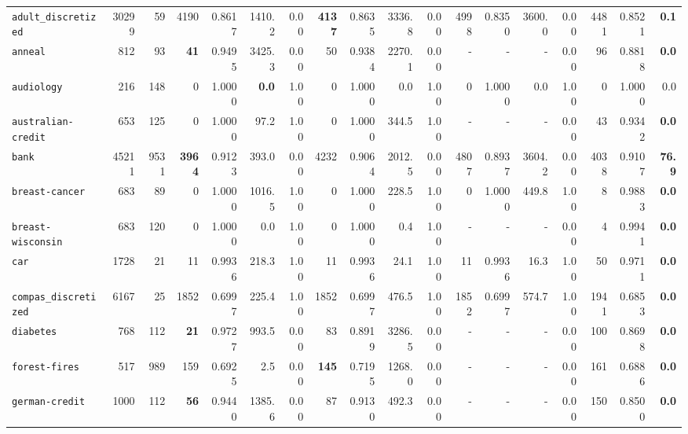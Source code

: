 \begin{tabular}{lccrrrrrrrrrrrrrrr}
\texttt{adult\_discretized} & \multicolumn{1}{r}{30299} & \multicolumn{1}{r}{59}  & 4190 & 0.8617 & 1410.2 & 0.00 & \textbf{4137} & 0.8635 & 3336.8 & 0.00 & 4998 & 0.8350 & 3600.0 & 0.00 & 4481 & 0.8521 & \textbf{0.1}\\
\texttt{anneal} & \multicolumn{1}{r}{812} & \multicolumn{1}{r}{93}  & \textbf{41} & 0.9495 & 3425.3 & 0.00 & 50 & 0.9384 & 2270.1 & 0.00 & - & - & - & 0.00 & 96 & 0.8818 & \textbf{0.0}\\
\texttt{audiology} & \multicolumn{1}{r}{216} & \multicolumn{1}{r}{148}  & 0 & 1.0000 & \textbf{0.0} & 1.00 & 0 & 1.0000 & 0.0 & 1.00 & 0 & 1.0000 & 0.0 & 1.00 & 0 & 1.0000 & 0.0\\
\texttt{australian-credit} & \multicolumn{1}{r}{653} & \multicolumn{1}{r}{125}  & 0 & 1.0000 & 97.2 & 1.00 & 0 & 1.0000 & 344.5 & 1.00 & - & - & - & 0.00 & 43 & 0.9342 & \textbf{0.0}\\
\texttt{bank} & \multicolumn{1}{r}{45211} & \multicolumn{1}{r}{9531}  & \textbf{3964} & 0.9123 & 393.0 & 0.00 & 4232 & 0.9064 & 2012.5 & 0.00 & 4807 & 0.8937 & 3604.2 & 0.00 & 4038 & 0.9107 & \textbf{76.9}\\
\texttt{breast-cancer} & \multicolumn{1}{r}{683} & \multicolumn{1}{r}{89}  & 0 & 1.0000 & 1016.5 & 1.00 & 0 & 1.0000 & 228.5 & 1.00 & 0 & 1.0000 & 449.8 & 1.00 & 8 & 0.9883 & \textbf{0.0}\\
\texttt{breast-wisconsin} & \multicolumn{1}{r}{683} & \multicolumn{1}{r}{120}  & 0 & 1.0000 & 0.0 & 1.00 & 0 & 1.0000 & 0.4 & 1.00 & - & - & - & 0.00 & 4 & 0.9941 & \textbf{0.0}\\
\texttt{car} & \multicolumn{1}{r}{1728} & \multicolumn{1}{r}{21}  & 11 & 0.9936 & 218.3 & 1.00 & 11 & 0.9936 & 24.1 & 1.00 & 11 & 0.9936 & 16.3 & 1.00 & 50 & 0.9711 & \textbf{0.0}\\
\texttt{compas\_discretized} & \multicolumn{1}{r}{6167} & \multicolumn{1}{r}{25}  & 1852 & 0.6997 & 225.4 & 1.00 & 1852 & 0.6997 & 476.5 & 1.00 & 1852 & 0.6997 & 574.7 & 1.00 & 1941 & 0.6853 & \textbf{0.0}\\
\texttt{diabetes} & \multicolumn{1}{r}{768} & \multicolumn{1}{r}{112}  & \textbf{21} & 0.9727 & 993.5 & 0.00 & 83 & 0.8919 & 3286.5 & 0.00 & - & - & - & 0.00 & 100 & 0.8698 & \textbf{0.0}\\
\texttt{forest-fires} & \multicolumn{1}{r}{517} & \multicolumn{1}{r}{989}  & 159 & 0.6925 & 2.5 & 0.00 & \textbf{145} & 0.7195 & 1268.0 & 0.00 & - & - & - & 0.00 & 161 & 0.6886 & \textbf{0.0}\\
\texttt{german-credit} & \multicolumn{1}{r}{1000} & \multicolumn{1}{r}{112}  & \textbf{56} & 0.9440 & 1385.6 & 0.00 & 87 & 0.9130 & 492.3 & 0.00 & - & - & - & 0.00 & 150 & 0.8500 & \textbf{0.0}\\

\end{tabular}
